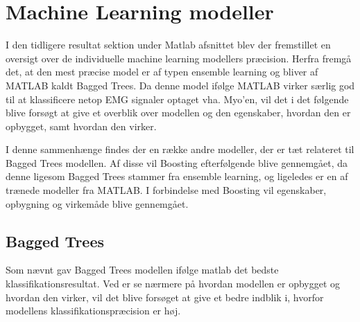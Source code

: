 \thispagestyle{fancy}
\chapter{Machine Learning modeller}
I den tidligere resultat sektion under Matlab afsnittet blev der fremstillet en oversigt over de individuelle machine learning modellers præcision. Herfra fremgå det, at den mest præcise model er af typen ensemble learning og bliver af MATLAB kaldt Bagged Trees. Da denne model ifølge MATLAB virker særlig god til at klassificere netop EMG signaler optaget vha. Myo'en, vil det i det følgende blive forsøgt at give et overblik over modellen og den egenskaber, hvordan den er opbygget, samt hvordan den virker. 

I denne sammenhænge findes der en række andre modeller, der er tæt relateret til Bagged Trees modellen. Af disse vil Boosting efterfølgende blive gennemgået, da denne ligesom Bagged Trees stammer fra ensemble learning, og ligeledes er en af trænede modeller fra MATLAB. I forbindelse med Boosting vil egenskaber, opbygning og virkemåde blive gennemgået.

\section{Bagged Trees}
Som nævnt gav Bagged Trees modellen ifølge matlab det bedste klassifikationsresultat.  Ved er se nærmere på hvordan modellen er opbygget og hvordan den virker, vil det blive forsøget at give et bedre indblik i, hvorfor modellens klassifikationspræcision er høj. 

